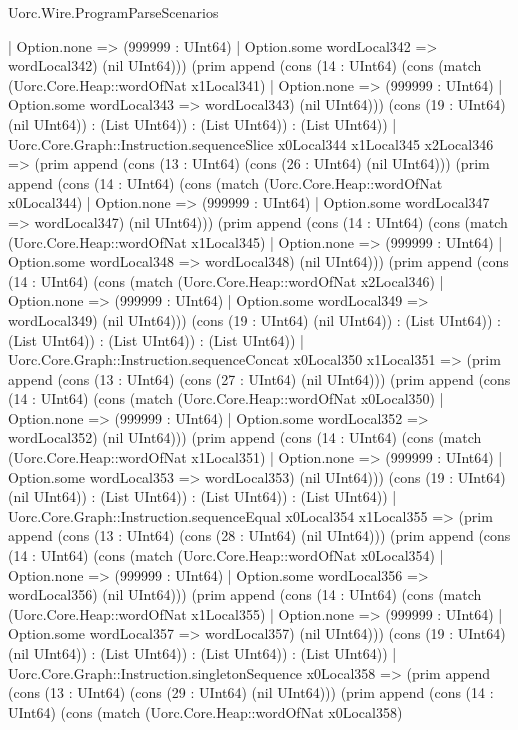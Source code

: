 \begin{lexlean}{Uorc.Wire.ProgramParseScenarios}
\begin{semanticmodule}
{      | Option.none => (999999 : UInt64)
      | Option.some wordLocal342 => wordLocal342) (nil UInt64))) (prim append (cons (14 : UInt64) (cons (match (Uorc.Core.Heap::wordOfNat x1Local341)
      | Option.none => (999999 : UInt64)
      | Option.some wordLocal343 => wordLocal343) (nil UInt64))) (cons (19 : UInt64) (nil UInt64)) : (List UInt64)) : (List UInt64)) : (List UInt64))
    | Uorc.Core.Graph::Instruction.sequenceSlice x0Local344 x1Local345 x2Local346 => (prim append (cons (13 : UInt64) (cons (26 : UInt64) (nil UInt64))) (prim append (cons (14 : UInt64) (cons (match (Uorc.Core.Heap::wordOfNat x0Local344)
      | Option.none => (999999 : UInt64)
      | Option.some wordLocal347 => wordLocal347) (nil UInt64))) (prim append (cons (14 : UInt64) (cons (match (Uorc.Core.Heap::wordOfNat x1Local345)
      | Option.none => (999999 : UInt64)
      | Option.some wordLocal348 => wordLocal348) (nil UInt64))) (prim append (cons (14 : UInt64) (cons (match (Uorc.Core.Heap::wordOfNat x2Local346)
      | Option.none => (999999 : UInt64)
      | Option.some wordLocal349 => wordLocal349) (nil UInt64))) (cons (19 : UInt64) (nil UInt64)) : (List UInt64)) : (List UInt64)) : (List UInt64)) : (List UInt64))
    | Uorc.Core.Graph::Instruction.sequenceConcat x0Local350 x1Local351 => (prim append (cons (13 : UInt64) (cons (27 : UInt64) (nil UInt64))) (prim append (cons (14 : UInt64) (cons (match (Uorc.Core.Heap::wordOfNat x0Local350)
      | Option.none => (999999 : UInt64)
      | Option.some wordLocal352 => wordLocal352) (nil UInt64))) (prim append (cons (14 : UInt64) (cons (match (Uorc.Core.Heap::wordOfNat x1Local351)
      | Option.none => (999999 : UInt64)
      | Option.some wordLocal353 => wordLocal353) (nil UInt64))) (cons (19 : UInt64) (nil UInt64)) : (List UInt64)) : (List UInt64)) : (List UInt64))
    | Uorc.Core.Graph::Instruction.sequenceEqual x0Local354 x1Local355 => (prim append (cons (13 : UInt64) (cons (28 : UInt64) (nil UInt64))) (prim append (cons (14 : UInt64) (cons (match (Uorc.Core.Heap::wordOfNat x0Local354)
      | Option.none => (999999 : UInt64)
      | Option.some wordLocal356 => wordLocal356) (nil UInt64))) (prim append (cons (14 : UInt64) (cons (match (Uorc.Core.Heap::wordOfNat x1Local355)
      | Option.none => (999999 : UInt64)
      | Option.some wordLocal357 => wordLocal357) (nil UInt64))) (cons (19 : UInt64) (nil UInt64)) : (List UInt64)) : (List UInt64)) : (List UInt64))
    | Uorc.Core.Graph::Instruction.singletonSequence x0Local358 => (prim append (cons (13 : UInt64) (cons (29 : UInt64) (nil UInt64))) (prim append (cons (14 : UInt64) (cons (match (Uorc.Core.Heap::wordOfNat x0Local358)
}
\end{semanticmodule}
\end{lexlean}

